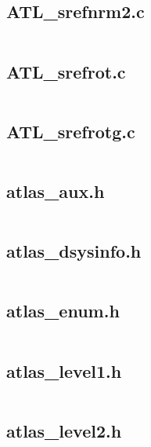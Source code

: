 \documentclass{article}
\begin{document}
\subsection{ATL\_srefnrm2.c}
\inputminted{c}{/home/dufferzafar/dev/@clones/scikit-learn/sklearn/src/cblas/ATL_srefnrm2.c}
\newpage

\subsection{ATL\_srefrot.c}
\inputminted{c}{/home/dufferzafar/dev/@clones/scikit-learn/sklearn/src/cblas/ATL_srefrot.c}
\newpage

\subsection{ATL\_srefrotg.c}
\inputminted{c}{/home/dufferzafar/dev/@clones/scikit-learn/sklearn/src/cblas/ATL_srefrotg.c}
\newpage

\subsection{atlas\_aux.h}
\inputminted{c}{/home/dufferzafar/dev/@clones/scikit-learn/sklearn/src/cblas/atlas_aux.h}
\newpage

\subsection{atlas\_dsysinfo.h}
\inputminted{c}{/home/dufferzafar/dev/@clones/scikit-learn/sklearn/src/cblas/atlas_dsysinfo.h}
\newpage

\subsection{atlas\_enum.h}
\inputminted{c}{/home/dufferzafar/dev/@clones/scikit-learn/sklearn/src/cblas/atlas_enum.h}
\newpage

\subsection{atlas\_level1.h}
\inputminted{c}{/home/dufferzafar/dev/@clones/scikit-learn/sklearn/src/cblas/atlas_level1.h}
\newpage

\subsection{atlas\_level2.h}
\inputminted{c}{/home/dufferzafar/dev/@clones/scikit-learn/sklearn/src/cblas/atlas_level2.h}
\newpage
\end{document}
